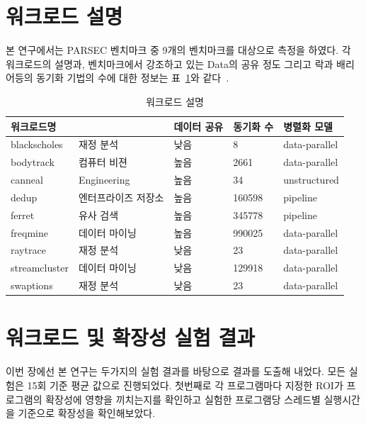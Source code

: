 \documentclass{kcc}
\begin{document}
\section{워크로드 설명}
본 연구에서는 PARSEC 벤치마크 중 9개의 벤치마크를 대상으로 측정을 하였다. 
각 워크로드의 설명과, 벤치마크에서 강조하고 있는 Data의 공유 정도 그리고
 락과 배리어등의 동기화 기법의 수에 대한 정보는  표~\ref{tab:workload}와 같다~\cite{parsecbench}.

\begin{table}[h!]
  \caption{워크로드 설명}
  \centering
  \scriptsize 
  \begin{tabular}{l l l l l} \toprule 
    워크로드명 &  & 데이터 공유 & 동기화 수 & 병렬화 모델\\
    \midrule
    blackscholes & 재정 분석 & 낮음 & 8 & data-parallel\\
    \midrule
    bodytrack & 컴퓨터 비젼 & 높음 & 2661 & data-parallel\\
    \midrule
    canneal & Engineering & 높음 & 34 & unstructured\\
    \midrule
    dedup & 엔터프라이즈 저장소 & 높음 & 160598 & pipeline\\
    \midrule
    ferret & 유사 검색 & 높음 & 345778 & pipeline\\
    \midrule
    freqmine & 데이터 마이닝 & 높음 & 990025 & data-parallel\\
    \midrule
    raytrace & 재정 분석 & 낮음 & 23 & data-parallel \\
    \midrule
    streamcluster & 데이터 마이닝 & 낮음 & 129918 & data-parallel\\
    \midrule
    swaptions & 재정 분석 & 낮음 & 23 & data-parallel \\
    \bottomrule
  \end{tabular}
  \label{tab:workload}
\end{table}

\section{워크로드 및 확장성 실험 결과}
 이번 장에선 본 연구는 두가지의 실험 결과를 바탕으로 결과를 도출해 내었다. 모든 실험은 15회 기준 평균 값으로 진행되었다.
첫번째로 각 프로그램마다 지정한 ROI가 프로그램의 확장성에 영향을 끼치는지를 확인하고 실험한 프로그램당 스레드별 실행시간을 기준으로 확장성을 확인해보았다.
\end{document}
